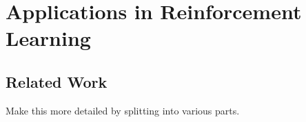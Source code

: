 \section{Applications in Reinforcement Learning}
\subsection{Related Work}
Make this more detailed by splitting into various parts.
\begin{comment}
LSA with CS-PR was considered in \cite{polyak-judisky} under the additive noise assumption, wherein $A_t=A$. Recent work by \cite{bach} considers a stochastic gradient descent (SGD) algorithm for the problem of linear prediction given in \Cref{ex:linreg}.
\begin{example}\label{ex:linreg}
Let $(x_t,y_t)\in \R^d\times \R,\,t\geq 1$ be $i.i.d$ such that $\EE{\norm{x_t}^2}$ and $\EE{y_t^2}$ are finite. Further, we assume bounded data i.e., $\norm{(x_t,y_t)}^2\leq B$ for some positive real number $B>0$. Here, $x_t,\,t\geq 1$ are the features and $y_t$ are real labels and the linear regression problem constitutes minimizing the quadratic loss function $f(\theta)=\EE{\left(\ip{x_t,\theta}-y_t\right)^2}$. SGD with CS-PR to minimize $f(\theta)$ can be given as below:
\begin{subequations}\label{eq:linreg}
\begin{align}
\theta_t&=\theta_{t-1}-\alpha x_t\left(\ip{x_t,\theta_{t-1}} -y_t\right)\\
\thh_t&=\frac{1}{t+1}\sum_{s=0}^t \theta_t
\end{align}
\end{subequations}
Here $\nabla f(\theta_{t-1})=x_t\left(\ip{x_t,\theta_{t-1} -y_t}\right)$ is the \emph{stochastic gradient} of the objective $f(\theta)$. It follows from the $i.i.d$ assumption on $(x_t,y_t)$ that $A_t=x_t x_t^\top$ and $b_t=y_t x_t$ are also $i.i.d$, and with this identification one can see that \eqref{linreg} is of the form in \eqref{conststep}. In this case $A_P$ is SPD.
In the linear regression setting, the error of a parameter $\theta$ is measured as the difference between the loss at the said parameter and the loss at the optimum, which has the following form
\begin{align}\label{eq:mselinreg}
f(\theta)-f(\ts)=(\theta-\ts)^\top A_P (\theta-\ts)=\EE{\norm{\theta-\ts}^2_{A_P}}
\end{align}
\end{example}
In this setting, \cite{bach} show that the variance term in the MSE is at most $O(\frac{C}{t})$, where $C$ does not depend on the condition number. This ``remarkable'' result is due to the following facts: $(i)$ $A_P$ in this case is symmetric positive definite, $(ii)$ the MSE in \eqref{eq:mselinreg} is measured with respect to $A_P$, $(iii)$ the noise $\epsilon_t=y_t-\ip{\ts,x_{t-1}}$ is structured i.e., $\EE{\epsilon_t^2 x_t x_t^\top}\leq R A_P$ for some constant $R>0$.
At the same time, the bias term decays at a rate $\frac{C'}{t^2}$, where the constant $C'$ contains the factor $(\theta_0-\ts)^\top A^{-1}_P (\theta_0-\ts)$ and is dependent on the condition number.
\end{comment}
